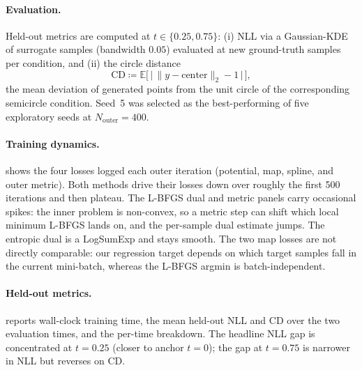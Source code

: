 \documentclass[11pt,a4paper]{article}
\newcommand{\E}{\mathbb{E}}
\newcommand{\defeq}{\coloneqq}
\newcommand{\theSeed}{5}%
\begin{document}
\paragraph{Evaluation.}
Held-out metrics are computed at $t\in\{0.25,0.75\}$: (i) NLL via a
Gaussian-KDE of surrogate samples (bandwidth $0.05$) evaluated at new ground-truth samples per condition, and (ii) the
circle distance
\[
\mathrm{CD} \defeq \E\bigl[\,\bigl|\,\|y - \text{center}\|_2 - 1\,\bigr|\,\bigr],
\]
the mean deviation of generated points from the unit circle of the
corresponding semicircle condition.
Seed~\theSeed{} was selected as the best-performing of five
exploratory seeds at $N_{\text{outer}}=400$.

\paragraph{Training dynamics.}
 shows the four losses logged each outer iteration
(potential, map, spline, and outer metric). Both methods drive their
losses down over roughly the first 500 iterations and then plateau. The
L-BFGS dual and metric panels carry occasional spikes: the inner
problem is non-convex, so a metric step can shift which local minimum
L-BFGS lands on, and the per-sample dual estimate jumps. The entropic
dual is a LogSumExp and stays smooth. The two map losses are not
directly comparable: our regression target depends on which target
samples fall in the current mini-batch, whereas the L-BFGS argmin is
batch-independent.

\paragraph{Held-out metrics.}
 reports wall-clock training time, the mean held-out
NLL and CD over the two evaluation times, and the per-time breakdown.
The headline NLL gap is concentrated at $t=0.25$
(closer to anchor $t=0$); the gap at $t=0.75$ is narrower in NLL but reverses on CD.
\end{document}
